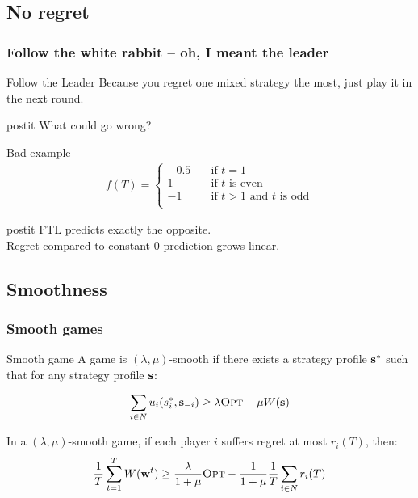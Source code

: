 \documentclass{beamer}
\renewcommand{\vec}[1]{\ensuremath{{\bf #1}}}
\newcommand{\st}{\ensuremath{s}}
\newcommand{\mst}{\ensuremath{w}}
\newcommand{\opt}{\text{\textsc{Opt}} }
\begin{document}
\subsection{No regret}
\begin{frame}
	\frametitle{Follow the white rabbit -- oh, I meant the leader}
	\begin{block}{Follow the Leader}
		Because you regret one mixed strategy the most, just play it in the next round.
	\end{block}
	\pause
	\begin{beamercolorbox}[sep=1em]{postit}
		What could go wrong?
	\end{beamercolorbox}
	\pause
	\begin{block}{Bad example}
		\begin{align*}
			 f(T) =
			\begin{cases}
			-0.5       & \quad \text{if } t = 1 \\
			1  & \quad \text{if } t \text{ is even}\\
			-1  & \quad \text{if } t > 1 \text{ and } t \text{ is odd}\\
			\end{cases}
		\end{align*}
		\begin{beamercolorbox}[sep=1em]{postit}
			FTL predicts exactly the opposite.\\
			Regret compared to constant 0 prediction grows linear.
		\end{beamercolorbox}
	\end{block}
\end{frame}







\subsection{Smoothness}
\begin{frame}
	\frametitle{Smooth games}
	\begin{block}{Smooth game}
		A game is
		$(\lambda,\mu)$-smooth if there exists a strategy profile
		$\vec{\st}^*$ such that for any strategy profile $\vec{\st}$:
		
		\begin{equation*}
		\sum_{i\in N} u_i(\st_i^*,\vec{\st}_{-i}) \geq \lambda \opt - \mu
		W(\vec{\st})
		\end{equation*}
	\end{block}
	\pause
	\begin{block}{}
		In a $(\lambda,\mu)$-smooth game, if each player $i$ suffers regret at
		most $r_i(T)$, then:
		\begin{equation*}
		\frac{1}{T} \sum_{t=1}^{T}
		W(\vec{\mst}^t) \geq \frac{\lambda}{1+\mu} \opt
		- \frac{1}{1+\mu}\frac{1}{T}\sum_{i\in N} r_i(T)
		\end{equation*}
	\end{block}
\end{frame}
\end{document}
